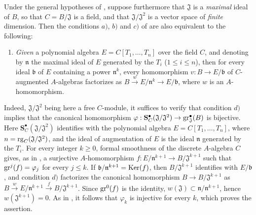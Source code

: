 \begin{remark}[19.5.5]
\label{0.19.5.5}
Under the general hypotheses of , suppose furthermore that $\mathfrak{J}$ is a \emph{maximal} ideal of $B$, so that $C=B/\mathfrak{J}$ is a field, and that $\mathfrak{J}/\mathfrak{J}^2$ is a vector space of \emph{finite} dimension.
Then the conditions $a)$, $b)$ and $c)$ of  are also equivalent to the following:
\begin{enumerate}
  \item[d)] \emph{Given} a polynomial algebra $E=C[T_1,\ldots,T_n]$ over the field $C$, and denoting by $\mathfrak{n}$ the maximal ideal of $E$ generated by the $T_i$ ($1\leq i\leq n$), then for every ideal $\mathfrak{b}$ of $E$ containing a power $\mathfrak{n}^k$, every homomorphism $v:B\to E/\mathfrak{b}$ of $C$-augmented $A$-algebras factorizes as $B\xrightarrow{w}E/\mathfrak{n}^k\to E/\mathfrak{b}$,
  where $w$ is an $A$-homomorphism.
\end{enumerate}
Indeed, $\mathfrak{J}/\mathfrak{J}^2$ being here a free $C$-module, it suffices to verify that condition $d)$ implies that the canonical homomorphism
$\varphi:\mathbf{S}_C^\bullet(\mathfrak{J}/\mathfrak{J}^2)\to\operatorname{gr}_\mathfrak{J}^\bullet(B)$
is bijective.
Here $\mathbf{S}_C^\bullet(\mathfrak{J}/\mathfrak{J}^2)$ identifies with the polynomial algebra $E=C[T_1,\ldots,T_n]$, where $n=\operatorname{rg}_C(\mathfrak{J}/\mathfrak{J}^2)$, and the ideal of augmentation of $E$ is the ideal $\mathfrak{n}$ generated by the $T_i$.
For every integer $k\geq 0$, formal smoothness of the discrete $A$-algebra $C$ gives, as in , a surjective $A$-homomorphism $f:E/\mathfrak{n}^{k+1}\to B/\mathfrak{J}^{k+1}$
such that $\operatorname{gr}^j(f)=\varphi_j$ for every $j\leq k$.
If $\mathfrak{b}/\mathfrak{n}^{k+1}=\operatorname{Ker}(f)$, then $B/\mathfrak{J}^{k+1}$ identifies with $E/\mathfrak{b}$, and condition $d)$ factorizes the canonical homomorphism $B\to B/\mathfrak{J}^{k+1}$ as $B\xrightarrow{w}E/\mathfrak{n}^{k+1}
\xrightarrow{f}B/\mathfrak{J}^{k+1}$.
Since $\operatorname{gr}^0(f)$ is the identity, $w(\mathfrak{J})\subset\mathfrak{n}/\mathfrak{n}^{k+1}$, hence $w(\mathfrak{J}^{k+1})=0$.
As in , it follows that $\varphi_k$ is injective for every $k$, which proves the assertion.
\end{remark}

